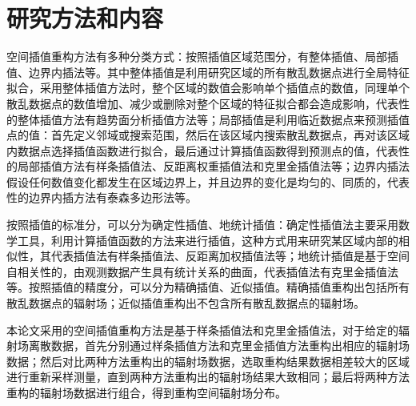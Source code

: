 \section{研究方法和内容}
空间插值重构方法有多种分类方式\textsuperscript{\cite{李海涛2019空间插值分析算法综述}}：按照插值区域范围分，有整体插值、局部插值、边界内插法等。其中整体插值是利用研究区域的所有散乱数据点进行全局特征拟合，采用整体插值方法时，整个区域的数值会影响单个插值点的数值，同理单个散乱数据点的数值增加、减少或删除对整个区域的特征拟合都会造成影响，代表性的整体插值方法有趋势面分析插值方法等；局部插值是利用临近数据点来预测插值点的值：首先定义邻域或搜索范围，然后在该区域内搜索散乱数据点，再对该区域内数据点选择插值函数进行拟合，最后通过计算插值函数得到预测点的值，代表性的局部插值方法有样条插值法、反距离权重插值法和克里金插值法等；边界内插法假设任何数值变化都发生在区域边界上，并且边界的变化是均匀的、同质的，代表性的边界内插方法有泰森多边形法等。

按照插值的标准分，可以分为确定性插值、地统计插值：确定性插值法主要采用数学工具，利用计算插值函数的方法来进行插值，这种方式用来研究某区域内部的相似性，其代表插值法有样条插值法、反距离加权插值法等；地统计插值是基于空间自相关性的，由观测数据产生具有统计关系的曲面，代表插值法有克里金插值法等。按照插值的精度分，可以分为精确插值、近似插值。精确插值重构出包括所有散乱数据点的辐射场；近似插值重构出不包含所有散乱数据点的辐射场。

本论文采用的空间插值重构方法是基于样条插值法和克里金插值法，对于给定的辐射场离散数据，首先分别通过样条插值方法和克里金插值方法重构出相应的辐射场数据；然后对比两种方法重构出的辐射场数据，选取重构结果数据相差较大的区域进行重新采样测量，直到两种方法重构出的辐射场结果大致相同；最后将两种方法重构的辐射场数据进行组合，得到重构空间辐射场分布。